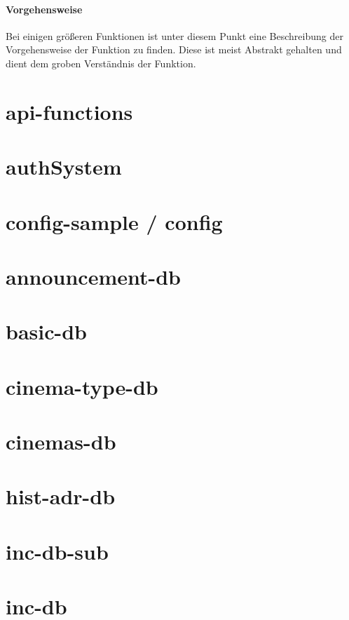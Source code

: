 \paragraph{Vorgehensweise} Bei einigen größeren Funktionen ist unter diesem Punkt eine Beschreibung der Vorgehensweise der Funktion zu finden. Diese ist meist Abstrakt gehalten und dient dem groben Verständnis der Funktion.
\newpage
\section{api-functions}

\newpage
\section{authSystem}

\newpage
\section{config-sample / config}

\newpage
\section{announcement-db}

\newpage
\section{basic-db}

\newpage
\section{cinema-type-db}

\newpage
\section{cinemas-db}

\newpage
\section{hist-adr-db}

\newpage
\section{inc-db-sub}

\newpage
\section{inc-db}

\newpage
